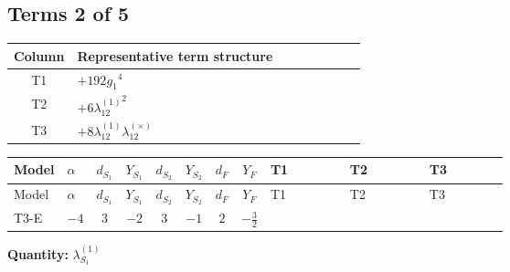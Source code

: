 \documentclass[8pt]{article}
\begin{document}
\begin{landscape}
\subsection*{Terms 2 of 5}
\begin{center}
\begin{tabular}{@{}c >{\raggedright\arraybackslash}p{0.82\linewidth}@{}}
\toprule
Column & Representative term structure \\
\midrule
T1 & \(\displaystyle +192 {g_1}^4\) \\
\midrule
T2 & \(\displaystyle +6 {\lambda_{12}^{(1)}}^2\) \\
\midrule
T3 & \(\displaystyle +8 {\lambda_{12}^{(1)}} {\lambda_{12}^{(\times)}}\) \\
\midrule
\bottomrule
\end{tabular}
\end{center}
\smallskip
\tiny
\begin{longtable}{@{}llcccccc >{\raggedright\arraybackslash}p{0.21\linewidth} >{\raggedright\arraybackslash}p{0.21\linewidth} >{\raggedright\arraybackslash}p{0.21\linewidth}@{}}
\toprule
Model & $\alpha$ & $d_{S_1}$ & $Y_{S_1}$ & $d_{S_2}$ & $Y_{S_2}$ & $d_F$ & $Y_F$ & T1 & T2 & T3 \\
\midrule
\endfirsthead
\toprule
Model & $\alpha$ & $d_{S_1}$ & $Y_{S_1}$ & $d_{S_2}$ & $Y_{S_2}$ & $d_F$ & $Y_F$ & T1 & T2 & T3 \\
\midrule
\endhead
T3-E & $-4$ & $3$ & $-2$ & $3$ & $-1$ & $2$ & $-\frac{3}{2}$ & \scriptsize\adjustbox{max width=\linewidth}{$\begin{gathered} +192 {g_1}^4\end{gathered}$} & \scriptsize\adjustbox{max width=\linewidth}{$\begin{gathered} +6 {\lambda_{12}^{(1)}}^2\end{gathered}$} & \scriptsize\adjustbox{max width=\linewidth}{$\begin{gathered} +8 {\lambda_{12}^{(1)}} {\lambda_{12}^{(\times)}}\end{gathered}$} \\
\midrule
\bottomrule
\end{longtable}
\clearpage
\noindent\textbf{Quantity: }$\lambda_{S_1}^{(1)}$\par\smallskip

\end{landscape}
\end{document}
